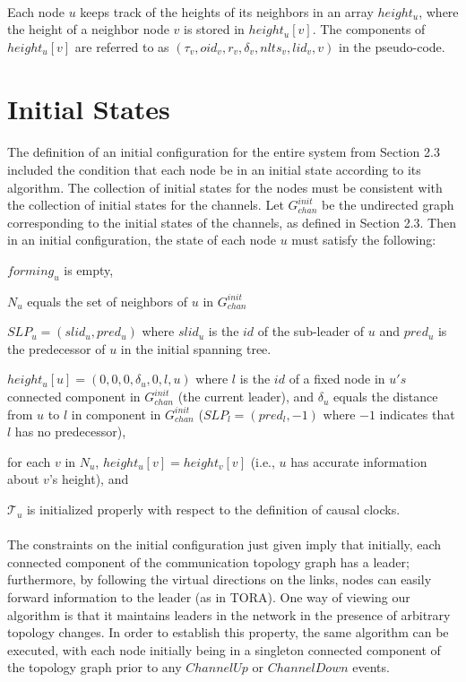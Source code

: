 \paragraph{}Each node $u$ keeps track of the heights of its neighbors in an array $height_u$, where the height of a neighbor node $v$ is stored in $height_u[v]$. The components of $height_u[v]$ are referred to as $(\tau _v , oid_v , r_v , \delta _v , nlts_v , lid_v , v)$ in the pseudo-code.
\section{Initial States}
\paragraph{}The definition of an initial configuration for the entire system from Section 2.3 included the condition that each node be in an initial state according to its algorithm. The collection of initial states for the nodes must be consistent with the collection of initial states for the channels. Let $G^{init} _{chan}$ be the undirected graph corresponding to the initial states of the channels, as defined in Section 2.3. Then in an initial configuration, the state of each node $u$ must satisfy the following:
\begin{list}{--}{}
	\item $forming_u$ is empty,
	\item $N_u$ equals the set of neighbors of $u$ in $G ^{init} _{chan}$
	\item $SLP_u = (slid_u, pred_u)$ where $slid_u$ is the $id$ of the sub-leader of $u$ and $pred_u$ is the predecessor of $u$ in the initial spanning tree.
	\item $height_u[u] = (0, 0, 0, \delta _u , 0, l, u)$ where $l$ is the $id$ of a fixed node in $u's$ connected component in $G^{init} _{chan}$ (the current leader), and $\delta _u$ equals the distance from $u$ to $l$ in component in $G^{init} _{chan}$ ($SLP_l = (pred_l, -1)$ where $-1$ indicates that $l$ has no predecessor),
	\item for each $v$ in $N_u$, $height_u[v] = height_v[v]$ (i.e., $u$ has accurate information about $v$’s height), and
	\item $\mathcal{T} _u$ is initialized properly with respect to the definition of causal clocks.
\end{list}
\paragraph{}The constraints on the initial configuration just given imply that initially, each connected component of the communication topology graph has a leader; furthermore, by following the virtual directions on the links, nodes can easily forward information to the leader (as in TORA). One way of viewing our algorithm is that it maintains leaders in the network in the presence of arbitrary topology changes. In order to establish this property, the same algorithm can be executed, with each node initially being in a singleton connected component of the topology graph prior to any $ChannelUp$ or $ChannelDown$ events.
